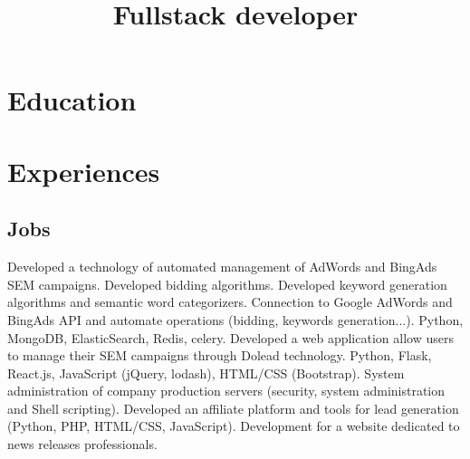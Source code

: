 \documentclass[10pt,a4paper]{moderncv}
\title{Fullstack developer}
\begin{document}
    \maketitle

    \section{Education}

    \section{Experiences}
        \subsection{Jobs}
                {Developed a technology of automated management of AdWords and BingAds SEM campaigns. \newline{}
                Developed bidding algorithms. \newline{}
                Developed keyword generation algorithms and semantic word categorizers. \newline{}
                Connection to Google AdWords and BingAds API and automate operations (bidding, keywords generation...).\newline{}
                Python, MongoDB, ElasticSearch, Redis, celery.\newline{}\newline{}
                Developed a web application allow users to manage their SEM campaigns through Dolead technology.\newline{}
                Python, Flask, React.js, JavaScript (jQuery, lodash), HTML/CSS (Bootstrap).\newline{}}
                {System administration of company production servers (security, system administration and Shell scripting).\newline{}
                Developed an affiliate platform and tools for lead generation (Python, PHP, HTML/CSS, JavaScript). \newline{}}
                {Development for a website dedicated to news releases professionals.}
\end{document}
